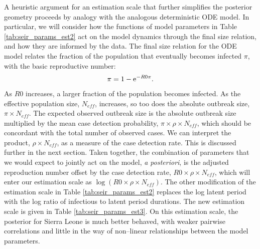A heuristic argument for an estimation scale that further simplifies the posterior geometry proceeds by analogy with the analogous deterministic ODE model. In particular, we will consider how the functions of model parameters in Table \ref{tab:seir_params_est2} act on the model dynamics through the final size relation, and how they are informed by the data. The final size relation for the ODE model \cite{miller2012note} relates the fraction of the population that eventually becomes infected $ \pi $, with the basic reproductive number:
\begin{equation}
\label{eqn:final_size_relation}
\pi = 1 - \mathrm{e}^{-R0\pi}.
\end{equation}
As $ R0 $ increases, a larger fraction of the population becomes infected. As the effective population size, $ N_{eff}$, increases, so too does the absolute outbreak size, $ \pi \times N_{eff} $. The expected observed outbreak size is the absolute outbreak size multiplied by the mean case detection probability, $ \pi \times \rho \times N_{eff} $, which should be concordant with the total number of observed cases. We can interpret the product, $ \rho \times N_{eff} $, as a measure of the case detection rate. This is discussed further in the next section. Taken together, the combination of parameters that we would expect to jointly act on the model, \textit{a posteriori}, is the adjusted reproduction number offset by the case detection rate, $ R0\times\rho \times N_{eff} $, which will enter our estimation scale as $ \log(R0\times\rho\times N_{eff}) $. The other modification of the estimation scale in Table \ref{tab:seir_params_est2} replaces the log latent period with the log ratio of infectious to latent period durations. The new estimation scale is given in Table \ref{tab:seir_params_est3}. On this estimation scale, the posterior for Sierra Leone is much better behaved, with weaker pairwise correlations and little in the way of non--linear relationships between the model parameters. 

